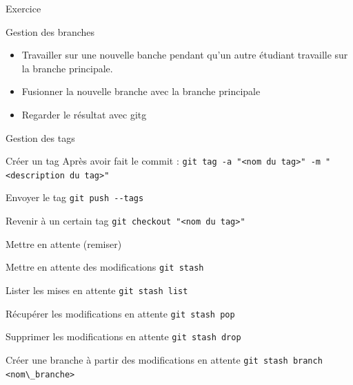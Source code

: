 \documentclass{beamer}
\begin{document}
\begin{frame}[fragile]{Exercice}
  \begin{exampleblock}{Gestion des branches}
    \begin{itemize}
    \item Travailler sur une nouvelle banche pendant qu'un autre étudiant travaille sur la branche principale.
    \item Fusionner la nouvelle branche avec la branche principale
    \item Regarder le résultat avec gitg
    \end{itemize}
  \end{exampleblock}
\end{frame}

\begin{frame}[fragile]{Gestion des tags}
  \begin{block}{Créer un tag}
    Après avoir fait le commit :\linebreak
    \textcolor{commandcolor}{\verb?git tag -a "<nom du tag>" -m "<description du tag>"?}
  \end{block}
  \begin{block}{Envoyer le tag}
    \textcolor{commandcolor}{\verb?git push --tags?}
  \end{block}
  \begin{block}{Revenir à un certain tag}
    \textcolor{commandcolor}{\verb?git checkout "<nom du tag>"?}
  \end{block}
\end{frame}

\begin{frame}[fragile]{Mettre en attente (remiser)}
  \begin{block}{Mettre en attente des modifications}
    \textcolor{commandcolor}{\verb?git stash?}
  \end{block}
  \begin{block}{Lister les mises en attente}
    \textcolor{commandcolor}{\verb?git stash list?}
  \end{block}
  \begin{block}{Récupérer les modifications en attente}
    \textcolor{commandcolor}{\verb?git stash pop?}
  \end{block}
  \begin{block}{Supprimer les modifications en attente}
    \textcolor{commandcolor}{\verb?git stash drop?}
  \end{block}
  \begin{block}{Créer une branche à partir des modifications en attente}
    \textcolor{commandcolor}{\verb?git stash branch <nom\_branche> ?}
  \end{block}
\end{frame}
\end{document}
